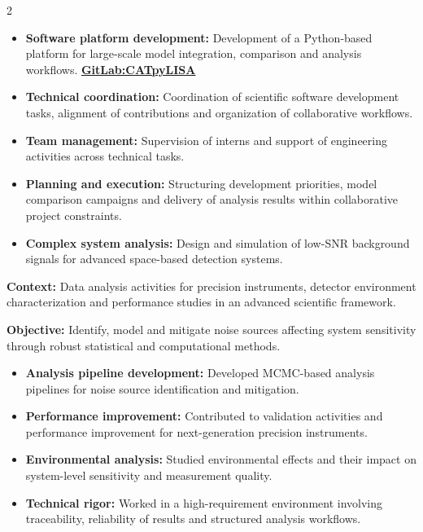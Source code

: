 \documentclass[8pt,a4paper,ragged2e,withhyper]{altacv}
\begin{document}
\begin{paracol}{2}
\begin{itemize}
\item \textbf{Software platform development:} Development of a Python-based platform for large-scale model integration, comparison and analysis workflows. \textcolor{DarkPastelRed}{\href{https://gitlab.oca.eu/gboileau/lisa_l3_tools}{\bf GitLab:CATpyLISA}}
\item \textbf{Technical coordination:} Coordination of scientific software development tasks, alignment of contributions and organization of collaborative workflows.
\item \textbf{Team management:} Supervision of interns and support of engineering activities across technical tasks.
\item \textbf{Planning and execution:} Structuring development priorities, model comparison campaigns and delivery of analysis results within collaborative project constraints.
\item \textbf{Complex system analysis:} Design and simulation of low-SNR background signals for advanced space-based detection systems.
\end{itemize}

\divider


\textbf{Context:} Data analysis activities for precision instruments, detector environment characterization and performance studies in an advanced scientific framework.

\textbf{Objective:} Identify, model and mitigate noise sources affecting system sensitivity through robust statistical and computational methods.

\begin{itemize}
\item \textbf{Analysis pipeline development:} Developed MCMC-based analysis pipelines for noise source identification and mitigation.
\item \textbf{Performance improvement:} Contributed to validation activities and performance improvement for next-generation precision instruments.
\item \textbf{Environmental analysis:} Studied environmental effects and their impact on system-level sensitivity and measurement quality.
\item \textbf{Technical rigor:} Worked in a high-requirement environment involving traceability, reliability of results and structured analysis workflows.
\end{itemize}


\end{paracol}
\end{document}

